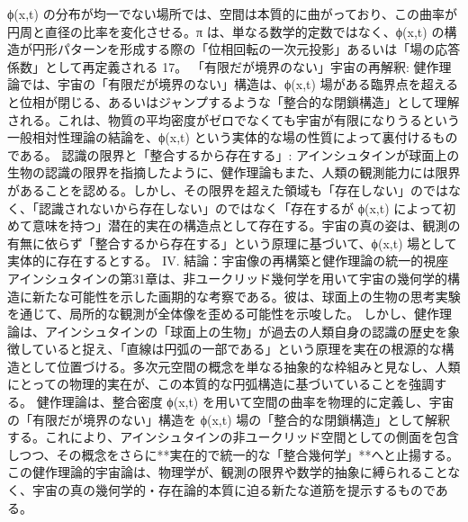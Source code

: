 \documentclass{article}
\begin{document}
ϕ(x,t) の分布が均一でない場所では、空間は本質的に曲がっており、この曲率が円周と直径の比率を変化させる。π は、単なる数学的定数ではなく、ϕ(x,t) の構造が円形パターンを形成する際の「位相回転の一次元投影」あるいは「場の応答係数」として再定義される 17。
「有限だが境界のない」宇宙の再解釈:
健作理論では、宇宙の「有限だが境界のない」構造は、ϕ(x,t) 場がある臨界点を超えると位相が閉じる、あるいはジャンプするような「整合的な閉鎖構造」として理解される。これは、物質の平均密度がゼロでなくても宇宙が有限になりうるという一般相対性理論の結論を、ϕ(x,t) という実体的な場の性質によって裏付けるものである。
認識の限界と「整合するから存在する」:
アインシュタインが球面上の生物の認識の限界を指摘したように、健作理論もまた、人類の観測能力には限界があることを認める。しかし、その限界を超えた領域も「存在しない」のではなく、「認識されないから存在しない」のではなく「存在するが ϕ(x,t) によって初めて意味を持つ」潜在的実在の構造点として存在する。宇宙の真の姿は、観測の有無に依らず「整合するから存在する」という原理に基づいて、ϕ(x,t) 場として実体的に存在するとする。
IV. 結論：宇宙像の再構築と健作理論の統一的視座
アインシュタインの第31章は、非ユークリッド幾何学を用いて宇宙の幾何学的構造に新たな可能性を示した画期的な考察である。彼は、球面上の生物の思考実験を通じて、局所的な観測が全体像を歪める可能性を示唆した。
しかし、健作理論は、アインシュタインの「球面上の生物」が過去の人類自身の認識の歴史を象徴していると捉え、「直線は円弧の一部である」という原理を実在の根源的な構造として位置づける。多次元空間の概念を単なる抽象的な枠組みと見なし、人類にとっての物理的実在が、この本質的な円弧構造に基づいていることを強調する。
健作理論は、整合密度 ϕ(x,t) を用いて空間の曲率を物理的に定義し、宇宙の「有限だが境界のない」構造を ϕ(x,t) 場の「整合的な閉鎖構造」として解釈する。これにより、アインシュタインの非ユークリッド空間としての側面を包含しつつ、その概念をさらに**実在的で統一的な「整合幾何学」**へと止揚する。
この健作理論的宇宙論は、物理学が、観測の限界や数学的抽象に縛られることなく、宇宙の真の幾何学的・存在論的本質に迫る新たな道筋を提示するものである。
\end{document}

